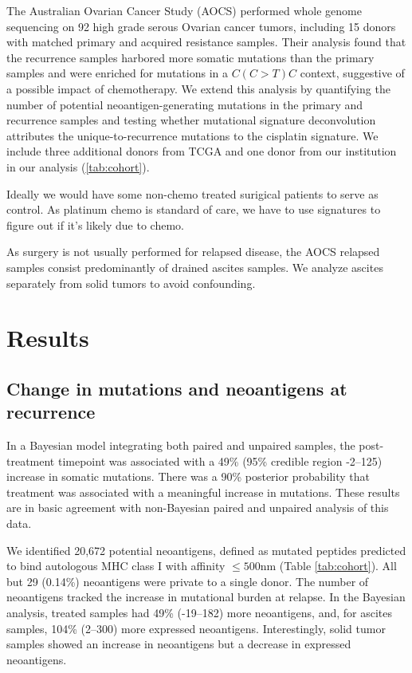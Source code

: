 The Australian Ovarian Cancer Study (AOCS)\cite{Patch_2015} performed whole genome sequencing on 92 high grade serous Ovarian cancer tumors, including 15 donors with matched primary and acquired resistance samples. Their analysis found that the recurrence samples harbored more somatic mutations than the primary samples and were enriched for mutations in a $C(C \gt T)C$ context, suggestive of a possible impact of chemotherapy. We extend this analysis by quantifying the number of potential neoantigen-generating mutations in the primary and recurrence samples and testing whether mutational signature deconvolution attributes the unique-to-recurrence mutations to the  cisplatin signature. We include three additional donors from TCGA and one donor from our institution in our analysis (\ref{tab:cohort}).

Ideally we would have some non-chemo treated surigical patients to serve as control. As platinum chemo is standard of care, we have to use signatures to figure out if it's likely due to chemo.

As surgery is not usually performed for relapsed disease, the AOCS relapsed samples consist predominantly of drained ascites samples. We analyze ascites separately from solid tumors to avoid confounding.



\section*{Results}

\subsection*{Change in mutations and neoantigens at recurrence}
In a Bayesian model integrating both paired and unpaired samples, the post-treatment timepoint was associated with a 49\% (95\% credible region -2--125) increase in somatic mutations. There was a 90\% posterior probability that treatment was associated with a meaningful increase in mutations. These results are in basic agreement with non-Bayesian paired and unpaired analysis of this data.

We identified 20,672 potential neoantigens, defined as mutated peptides predicted to bind autologous MHC class I with affinity $\leq 500$nm (Table \ref{tab:cohort}). All but 29 (0.14\%) neoantigens were private to a single donor. The number of neoantigens tracked the increase in mutational burden at relapse. In the Bayesian analysis, treated samples had 49\% (-19--182) more neoantigens, and, for ascites samples, 104\% (2--300) more expressed neoantigens. Interestingly, solid tumor samples showed an increase in neoantigens but a decrease in expressed neoantigens.

